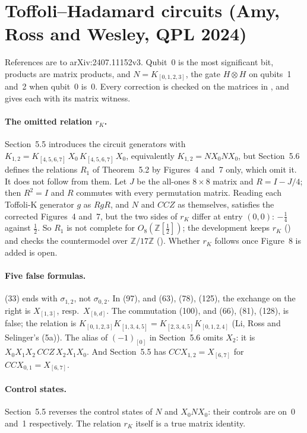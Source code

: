 \documentclass[11pt]{article}
\newcommand{\Z}{\mathbb{Z}}
\begin{document}
\section{Toffoli--Hadamard circuits (Amy, Ross and Wesley, QPL 2024)}

References are to arXiv:2407.11152v3. Qubit~0 is the most significant
bit, products are matrix products, and $N = K_{[0,1,2,3]}$, the gate
$H\otimes H$ on qubits~1 and~2 when qubit~0 is~0. Every correction is
checked on the matrices in , and
 gives each with its matrix witness.

\paragraph{The omitted relation $r_K$.} Section~5.5 introduces the
circuit generators with $K_{1,2} = K_{[4,5,6,7]}\,X_0\,K_{[4,5,6,7]}\,X_0$,
equivalently $K_{1,2} = N X_0 N X_0$, but Section~5.6 defines the
relations $R_1$ of Theorem~5.2 by Figures~4 and~7 only, which omit it.
It does not follow from them. Let $J$ be the all-ones $8\times8$
matrix and $R = I - J/4$; then $R^2 = I$ and $R$ commutes with every
permutation matrix. Reading each Toffoli-K generator $g$ as $RgR$, and
$N$ and $CCZ$ as themselves, satisfies the corrected Figures~4 and~7,
but the two sides of $r_K$ differ at entry $(0,0)$: $-\frac14$ against
$\frac12$. So $R_1$ is not complete for $O_8(\Z[\frac12])$; the
development keeps $r_K$ () and
checks the countermodel over $\Z/17\Z$
(). Whether $r_K$ follows once Figure~8 is
added is open.

\paragraph{Five false formulas.} (33) ends with $\sigma_{1,2}$, not
$\sigma_{0,2}$. In (97), and (63), (78), (125), the exchange on the
right is $X_{[1,3]}$, resp.\ $X_{[b,d]}$. The commutation (100), and
(66), (81), (128), is false; the relation is
$K_{[0,1,2,3]}K_{[1,3,4,5]} = K_{[2,3,4,5]}K_{[0,1,2,4]}$ (Li, Ross and
Selinger's (5a)). The alias of $(-1)_{[0]}$ in Section~5.6 omits $X_2$:
it is $X_0X_1X_2\,CCZ\,X_2X_1X_0$. And Section~5.5 has
$CCX_{1,2}=X_{[6,7]}$ for $CCX_{0,1}=X_{[6,7]}$.

\paragraph{Control states.} Section~5.5 reverses the control states of
$N$ and $X_0 N X_0$: their controls are on~0 and~1 respectively. The
relation $r_K$ itself is a true matrix identity.
\end{document}

